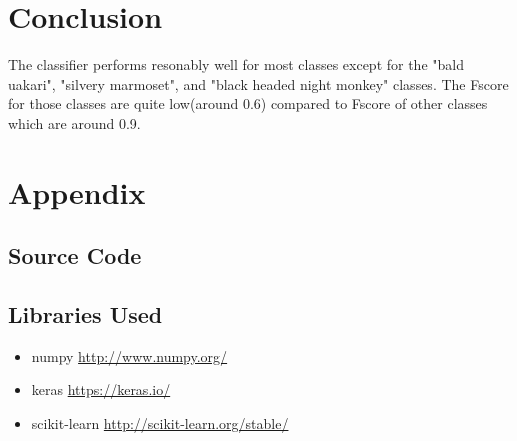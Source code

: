\documentclass[12pt]{article}
\begin{document}
\section{Conclusion}
The classifier performs resonably well for most classes except for the "bald uakari", "silvery marmoset", and "black headed night monkey" classes.
The Fscore for those classes are quite low(around 0.6) compared to Fscore of other classes which are around 0.9.

\newpage


\newpage

\section*{Appendix}

\subsection{Source Code}


\subsection{Libraries Used}

\begin{itemize}
    \item numpy \url{http://www.numpy.org/}
    \item keras \url{https://keras.io/}
    \item scikit-learn \url{http://scikit-learn.org/stable/}
\end{itemize}
\end{document}
